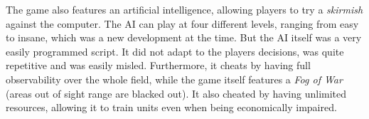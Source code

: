 The game also features an artificial intelligence, allowing players to try a \emph{skirmish} against the computer. The AI can play at four different levels, ranging from easy to insane, which was a new development at the time. But the AI itself was a very easily programmed script. It did not adapt to the players decisions, was quite repetitive and was easily misled. Furthermore, it cheats by having full observability over the whole field, while the game itself features a \emph{Fog of War} (areas out of sight range are blacked out). It also cheated by having unlimited resources, allowing it to train units even when being economically impaired.


